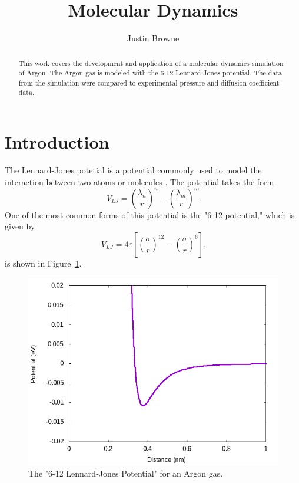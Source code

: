 \documentclass[]{article}
\begin{document}
\title{Molecular Dynamics}
\author{Justin Browne}
\date{}
\maketitle

\begin{abstract}
This work covers the development and application of a molecular dynamics simulation of Argon.
The Argon gas is modeled with the 6-12 Lennard-Jones potential.
The data from the simulation were compared to experimental pressure and diffusion coefficient data.
\end{abstract}

\section{Introduction}
The Lennard-Jones potetial is a potential commonly used to model the interaction between two atoms or molecules \cite{jones1924}.
The potential takes the form
\[
\phantom{.} V_{LJ} = \left(\frac{\lambda_{n}}{r}\right)^{n} - \left(\frac{\lambda_{m}}{r}\right)^{m} .
\]
One of the most common forms of this potential is the "6-12 potential," which is given by
\[
\phantom{.} V_{LJ} = 4\varepsilon \left[ \left(\frac{\sigma}{r}\right)^{12} - \left(\frac{\sigma}{r}\right)^{6} \right] ,
\]
is shown in Figure~\ref{fig:LJpot}.

\begin{figure}[htb]
	\centering
	\includegraphics[width=\textwidth]{figures/LJpot.png}
	\caption{The "6-12 Lennard-Jones Potential" for an Argon gas.}
	\label{fig:LJpot}
\end{figure}
\end{document}
